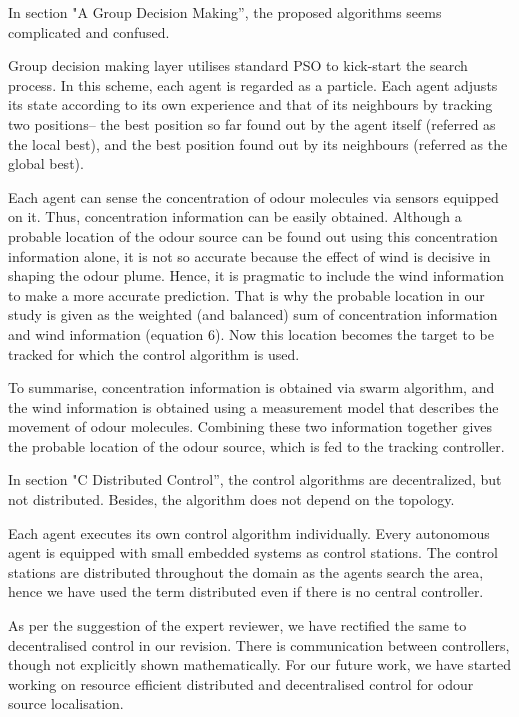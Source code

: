 \documentclass[10pt]{article}
\begin{document}
\begin{response}{In section "A Group Decision Making”, the proposed algorithms seems complicated and confused.}

Group decision making layer utilises standard PSO to kick-start the search process. In this scheme, each agent is regarded as a particle. Each agent adjusts its state according to its own experience and that of its neighbours by tracking two positions-- the best position so far found out by the agent itself (referred as the local best), and the best position found out by its neighbours (referred as the global best).

Each agent can sense the concentration of odour molecules via sensors equipped on it. Thus, concentration information can be easily obtained. Although a probable location of the odour source can be found out using this concentration information alone, it is not so accurate because the effect of wind is decisive in shaping the odour plume. Hence, it is pragmatic to include the wind information to make a more accurate prediction. That is why the probable location in our study is given as the weighted (and balanced) sum of concentration information and wind information (equation $6$). Now this location becomes the target to be tracked for which the control algorithm is used.

To summarise, concentration information is obtained via swarm algorithm, and the wind information is obtained using a measurement model that describes the movement of odour molecules. Combining these two information together gives the probable location of the odour source, which is fed to the tracking controller.

\end{response}

\begin{response}{In section "C Distributed Control”, the control algorithms are decentralized, but not distributed. Besides, the algorithm does not depend on the topology.}

Each agent executes its own control algorithm individually. Every autonomous agent is equipped with small embedded systems as control stations. The control stations are distributed throughout the domain as the agents search the area, hence we have used the term distributed even if there is no central controller.

As per the suggestion of the expert reviewer, we have rectified the same to decentralised control in our revision. There is communication between controllers, though not explicitly shown mathematically. For our future work, we have started working on resource efficient distributed and decentralised control for odour source localisation.

\end{response}
\end{document}
